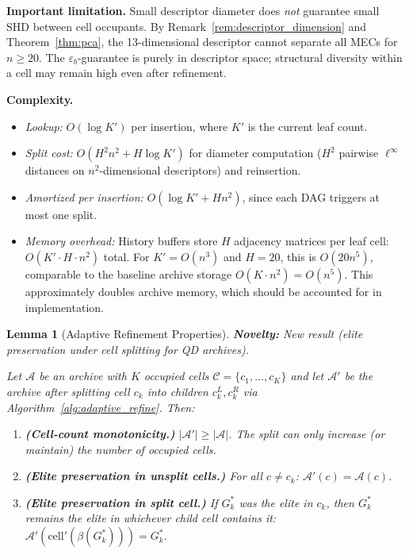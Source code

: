 \documentclass{article}
\theoremstyle{definition}
\theoremstyle{plain}
\newtheorem{lemma}{Lemma}
\theoremstyle{remark}
\begin{document}
\textbf{Important limitation.} Small descriptor diameter does \emph{not}
guarantee small SHD between cell occupants. By
Remark~\ref{rem:descriptor_dimension} and Theorem~\ref{thm:pca}, the
13-dimensional descriptor cannot separate all MECs for $n \geq 20$. The
$\varepsilon_b$-guarantee is purely in descriptor space; structural
diversity within a cell may remain high even after refinement.

\textbf{Complexity.}
\begin{itemize}
  \item \emph{Lookup:} $O(\log K')$ per insertion, where $K'$ is the current
    leaf count.
  \item \emph{Split cost:} $O(H^2 n^2 + H \log K')$ for diameter computation
    ($H^2$ pairwise $\ell^\infty$ distances on $n^2$-dimensional descriptors)
    and reinsertion.
  \item \emph{Amortized per insertion:} $O(\log K' + Hn^2)$, since each DAG
    triggers at most one split.
  \item \emph{Memory overhead:} History buffers store $H$ adjacency matrices
    per leaf cell: $O(K' \cdot H \cdot n^2)$ total. For $K' = O(n^3)$ and
    $H = 20$, this is $O(20n^5)$, comparable to the baseline archive
    storage $O(K \cdot n^2) = O(n^5)$. This approximately doubles archive
    memory, which should be accounted for in implementation.
\end{itemize}

\begin{lemma}[Adaptive Refinement Properties]
\label{lem:refinement_quality}
\textbf{Novelty:} New result (elite preservation under cell splitting for
QD archives).

Let $\mathcal{A}$ be an archive with $K$ occupied cells
$\mathcal{C} = \{c_1, \ldots, c_K\}$ and let $\mathcal{A}'$ be the archive
after splitting cell $c_k$ into children $c_k^L, c_k^R$ via
Algorithm~\ref{alg:adaptive_refine}. Then:
\begin{enumerate}
  \item[(a)] \textbf{(Cell-count monotonicity.)}
    $|\mathcal{A}'| \geq |\mathcal{A}|$.  The split can only increase
    (or maintain) the number of occupied cells.
  \item[(b)] \textbf{(Elite preservation in unsplit cells.)} For all
    $c \neq c_k$: $\mathcal{A}'(c) = \mathcal{A}(c)$.
  \item[(c)] \textbf{(Elite preservation in split cell.)} If $G_k^*$ was the
    elite in $c_k$, then $G_k^*$ remains the elite in whichever child cell
    contains it:
    $\mathcal{A}'(\mathrm{cell}'(\beta(G_k^*))) = G_k^*$.
\end{enumerate}
\end{lemma}
\end{document}
